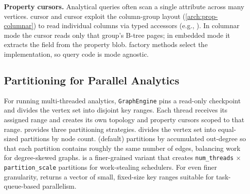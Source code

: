 \textbf{Property cursors.}
Analytical queries often scan a single attribute across many vertices.
 cursor and  cursor exploit the column-group layout (\autoref{arch:prop-columnar}) to read individual columns via typed accessors (e.g., ).
In columnar mode the cursor reads only that group's B-tree pages; in embedded mode it extracts the field from the property blob.
 factory methods select the implementation, so query code is mode agnostic.

\subsection{Partitioning for Parallel Analytics}
\label{arch:api:partitioning}

For running multi-threaded analytics, \texttt{GraphEngine} pins a read-only checkpoint and divides the vertex set into disjoint key ranges.
Each thread receives its assigned range and creates its own topology and property cursors scoped to that range.
\project{} provides three partitioning strategies.
 divides the vertex set into equal-sized partitions by node count.
 (default) partitions by accumulated out-degree so that each partition contains roughly the same number of edges, balancing work for degree-skewed graphs.
 is a finer-grained variant that creates \texttt{num\_threads} $\times$ \texttt{partition\_scale} partitions for work-stealing schedulers.
For even finer granularity,  returns a vector of small, fixed-size key ranges suitable for task-queue-based parallelism.
